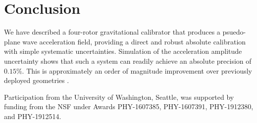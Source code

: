 \documentclass[superscriptaddress, twocolumn, prd]{revtex4-1}
\begin{document}
\section{Conclusion} 
\quad We have described a four-rotor gravitational calibrator that produces a psuedo-plane wave acceleration field, providing a direct and robust absolute calibration with simple systematic uncertainties. Simulation of the acceleration amplitude uncertainty shows that such a system can readily achieve an absolute precision of $0.15\%$. This is approximately an order of magnitude improvement over previously deployed geometries \cite{ncal}.

\begin{acknowledgements}

Participation from the University of Washington, Seattle, was supported by funding from the NSF under Awards PHY-1607385, PHY-1607391, PHY-1912380, and PHY-1912514.

\end{acknowledgements}


 

\end{document}
